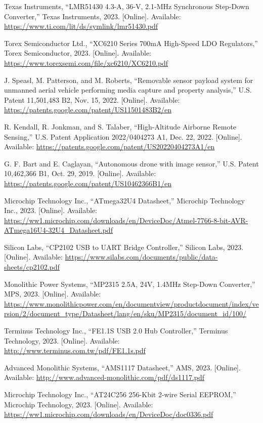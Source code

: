 \documentclass[12pt]{article}
\begin{document}
\begin{thebibliography}{99}
Texas Instruments, ``LMR51430 4.3-A, 36-V, 2.1-MHz Synchronous Step-Down Converter,'' Texas Instruments, 2023. [Online]. Available: \url{https://www.ti.com/lit/ds/symlink/lmr51430.pdf}

Torex Semiconductor Ltd., ``XC6210 Series 700mA High-Speed LDO Regulators,'' Torex Semiconductor, 2023. [Online]. Available: \url{https://www.torexsemi.com/file/xc6210/XC6210.pdf}

J. Speasl, M. Patterson, and M. Roberts, ``Removable sensor payload system for unmanned aerial vehicle performing media capture and property analysis,'' U.S. Patent 11,501,483 B2, Nov. 15, 2022. [Online]. Available: \url{https://patents.google.com/patent/US11501483B2/en}

R. Kendall, R. Jonkman, and S. Talaber, ``High-Altitude Airborne Remote Sensing,'' U.S. Patent Application 2022/0404273 A1, Dec. 22, 2022. [Online]. Available: \url{https://patents.google.com/patent/US20220404273A1/en}

G. F. Bart and E. Caglayan, ``Autonomous drone with image sensor,'' U.S. Patent 10,462,366 B1, Oct. 29, 2019. [Online]. Available: \url{https://patents.google.com/patent/US10462366B1/en}

Microchip Technology Inc., ``ATmega32U4 Datasheet,'' Microchip Technology Inc., 2023. [Online]. Available: \url{https://ww1.microchip.com/downloads/en/DeviceDoc/Atmel-7766-8-bit-AVR-ATmega16U4-32U4_Datasheet.pdf}

Silicon Labs, ``CP2102 USB to UART Bridge Controller,'' Silicon Labs, 2023. [Online]. Available: \url{https://www.silabs.com/documents/public/data-sheets/cp2102.pdf}

Monolithic Power Systems, ``MP2315 2.5A, 24V, 1.4MHz Step-Down Converter,'' MPS, 2023. [Online]. Available: \url{https://www.monolithicpower.com/en/documentview/productdocument/index/version/2/document_type/Datasheet/lang/en/sku/MP2315/document_id/100/}

Terminus Technology Inc., ``FE1.1S USB 2.0 Hub Controller,'' Terminus Technology, 2023. [Online]. Available: \url{http://www.terminus.com.tw/pdf/FE1.1s.pdf}

Advanced Monolithic Systems, ``AMS1117 Datasheet,'' AMS, 2023. [Online]. Available: \url{http://www.advanced-monolithic.com/pdf/ds1117.pdf}

Microchip Technology Inc., ``AT24C256 256-Kbit 2-wire Serial EEPROM,'' Microchip Technology, 2023. [Online]. Available: \url{https://ww1.microchip.com/downloads/en/DeviceDoc/doc0336.pdf}

\end{thebibliography}

\end{document}
